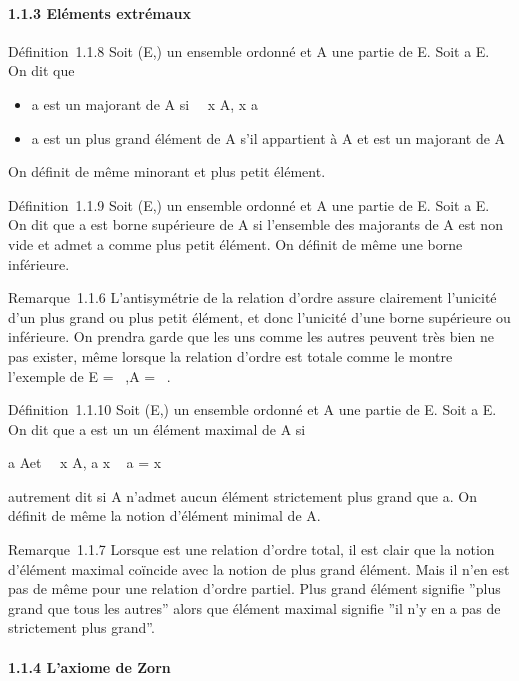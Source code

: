 \paragraph{1.1.3 Eléments extrémaux}

Définition~1.1.8 Soit (E,\leqslant) un ensemble ordonné et A une partie de E.
Soit a \in E. On dit que

\begin{itemize}
\itemsep1pt\parskip0pt
\item
  a est un majorant de A si \forall~~x \in A, x \leqslant a
\item
  a est un plus grand élément de A s'il appartient à A et est un
  majorant de A
\end{itemize}

On définit de même minorant et plus petit élément.

Définition~1.1.9 Soit (E,\leqslant) un ensemble ordonné et A une partie de E.
Soit a \in E. On dit que a est borne supérieure de A si l'ensemble des
majorants de A est non vide et admet a comme plus petit élément. On
définit de même une borne inférieure.

Remarque~1.1.6 L'antisymétrie de la relation d'ordre assure clairement
l'unicité d'un plus grand ou plus petit élément, et donc l'unicité d'une
borne supérieure ou inférieure. On prendra garde que les uns comme les
autres peuvent très bien ne pas exister, même lorsque la relation
d'ordre est totale comme le montre l'exemple de E = ~,A = ~.

Définition~1.1.10 Soit (E,\leqslant) un ensemble ordonné et A une partie de E.
Soit a \in E. On dit que a est un un élément maximal de A si

a \in A\text et \quad
\forall~~x \in A, a \leqslant x \rigtharrow~ a = x

autrement dit si A n'admet aucun élément strictement plus grand que a.
On définit de même la notion d'élément minimal de A.

Remarque~1.1.7 Lorsque \leqslant est une relation d'ordre total, il est clair
que la notion d'élément maximal coïncide avec la notion de plus grand
élément. Mais il n'en est pas de même pour une relation d'ordre partiel.
Plus grand élément signifie ''plus grand que tous les autres'' alors que
élément maximal signifie ''il n'y en a pas de strictement plus grand''.

\paragraph{1.1.4 L'axiome de Zorn}

